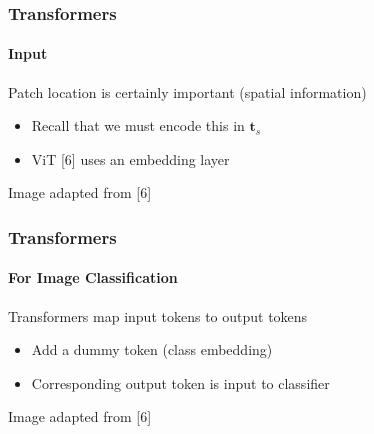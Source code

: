 \documentclass[xetex,professionalfont]{beamer}
\renewcommand\emph[1]{\textcolor{tuwcvl_cvl_blue}{#1}}
\renewcommand{\vec}[1]{\ensuremath{\mathbf{#1}}}
\newcommand{\vt}{\vec{t}}
\begin{document}
\begin{frame}
	\frametitle{Transformers}
	\framesubtitle{Input}

	Patch location is certainly important (spatial information)
	\begin{itemize}
		\item Recall that we must encode this in $\vt_s$
		\item ViT [6] uses an embedding layer %
	\end{itemize}

	\medskip

	\begin{center}
		{\centering Image adapted from [6]}
	\end{center}

\end{frame}


\begin{frame}
	\frametitle{Transformers}
	\framesubtitle{For Image Classification}

	Transformers map input tokens to output tokens
	\begin{itemize}
		\item Add a \emph{dummy token} (\emph{class embedding}) %
		\item Corresponding output token is input to classifier
	\end{itemize}

	\medskip

	\begin{center}
		{\centering Image adapted from [6]}
	\end{center}

\end{frame}
\end{document}
